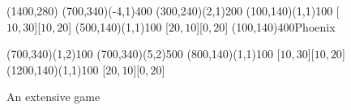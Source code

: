 \documentclass{article}
\begin{document}
\pagestyle{empty}
\begin{figure}[htb]
\hspace*{\fill}
\begin{egame}(1400,280)
\putbranch(700,340)(-4,1){400}
\putbranch(300,240)(2,1){200}
\putbranch(100,140)(1,1){100}
[$10,30$][$10,20$]
\putbranch(500,140)(1,1){100}
[$20,10$][$0,20$]
\infoset(100,140){400}{Phoenix}

\putbranch(700,340)(1,2){100}
\putbranch(700,340)(5,2){500}
\putbranch(800,140)(1,1){100}
[$10,30$][$10,20$]
\putbranch(1200,140)(1,1){100}
[$20,10$][$0,20$]

\end{egame}
\hspace*{\fill}
\caption[]{An extensive game}\label{f:one}
\end{figure}
\end{document}

